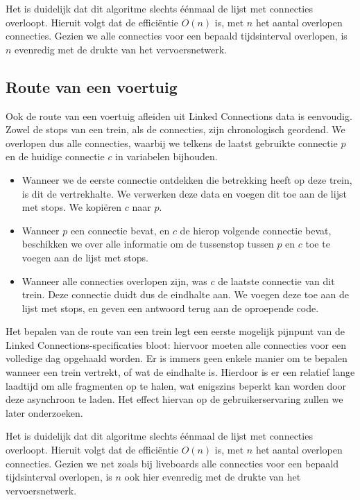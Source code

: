Het is duidelijk dat dit algoritme slechts éénmaal de lijst met connecties overloopt. Hieruit volgt dat de efficiëntie $O(n)$ is, met $n$ het aantal overlopen connecties. Gezien we alle connecties voor een bepaald tijdsinterval overlopen, is $n$ evenredig met de drukte van het vervoersnetwerk.

\subsection{Route van een voertuig}

Ook de route van een voertuig afleiden uit Linked Connections data is eenvoudig. Zowel de stops van een trein, als de connecties, zijn chronologisch geordend. We overlopen dus alle connecties, waarbij we telkens de laatst gebruikte connectie $p$ en de huidige connectie $c$ in variabelen bijhouden. 
\begin{itemize}
	\item Wanneer we de eerste connectie ontdekken die betrekking heeft op deze trein, is dit de vertrekhalte. We verwerken deze data en voegen dit toe aan de lijst met stops. We kopiëren $c$ naar $p$.
	\item Wanneer $p$ een connectie bevat, en $c$ de hierop volgende connectie bevat, beschikken we over alle informatie om de tussenstop tussen $p$ en $c$ toe te voegen aan de lijst met stops.
	\item Wanneer alle connecties overlopen zijn, was $c$ de laatste connectie van dit trein. Deze connectie duidt dus de eindhalte aan. We voegen deze toe aan de lijst met stops, en geven een antwoord terug aan de oproepende code.
\end{itemize}

Het bepalen van de route van een trein legt een eerste mogelijk pijnpunt van de Linked Connections-specificaties bloot: hiervoor moeten alle connecties voor een volledige dag opgehaald worden. Er is immers geen enkele manier om te bepalen wanneer een trein vertrekt, of wat de eindhalte is. Hierdoor is er een relatief lange laadtijd om alle fragmenten op te halen, wat enigszins beperkt kan worden door deze asynchroon te laden. Het effect hiervan op de gebruikerservaring zullen we later onderzoeken. 

Het is duidelijk dat dit algoritme slechts éénmaal de lijst met connecties overloopt. Hieruit volgt dat de efficiëntie $O(n)$ is, met $n$ het aantal overlopen connecties. Gezien we net zoals bij liveboards alle connecties voor een bepaald tijdsinterval overlopen, is $n$ ook hier evenredig met de drukte van het vervoersnetwerk.

